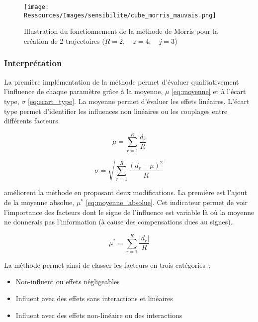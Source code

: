 \begin{figure}
    \begin{center}
        \texttt{[image: Ressources/Images/sensibilite/cube\_morris\_mauvais.png]}
    \end{center}
    \caption{Illustration du fonctionnement de la méthode de Morris pour la création
             de 2 trajectoires ($R = 2, \quad z = 4, \quad j = 3$)
             \label{fig:fonctionnement_morris}}
\end{figure}


\subsubsection{Interprétation} %
\label{ssub:interpretation}

La première implémentation de la méthode permet d’évaluer qualitativement l’influence de chaque
paramètre grâce à la moyenne, $\mu$ \eqref{eq:moyenne} et à l’écart type, $\sigma$ \eqref{eq:ecart_type}.
La moyenne permet d’évaluer les effets linéaires. L’écart type permet d’identifier
les influences non linéaires ou les couplages entre différents facteurs.

\begin{equation}\label{eq:moyenne}
    \mu = \sum_{r = 1}^{R} \frac{d_{r}}{R}
\end{equation}

\begin{equation}\label{eq:ecart_type}
    \sigma = \sqrt{\sum_{r=1}^{R}\frac{(d_{r} - \mu)^{2}}{R}}
\end{equation}

\cite{Campolongo20071509} améliorent la méthode en proposant deux modifications. La première
est l’ajout de la moyenne absolue, $\mu^{*}$ \eqref{eq:moyenne_absolue}. Cet indicateur permet
de voir l’importance des facteurs dont le signe de l’influence est variable là où
la moyenne ne donnerais pas l’information (à cause des compensations dues au signes).

\begin{equation}\label{eq:moyenne_absolue}
    \mu^{*} = \sum_{r = 1}^{R} \frac{\lvert d_{r} \rvert}{R}
\end{equation}

La méthode permet ainsi de classer les facteurs en trois catégories~:
\begin{itemize}
  \item Non-influent ou effets négligeables
  \item Influent avec des effets sans interactions et linéaires
  \item Influent avec des effets non-linéaire ou des interactions
\end{itemize}


